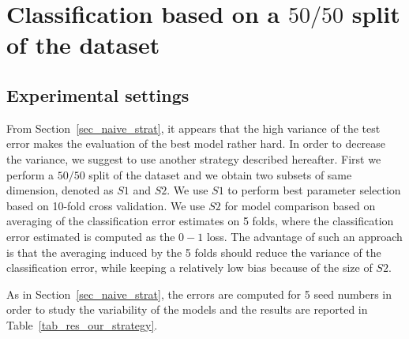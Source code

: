 \section{Classification based on a $50/50$ split of the dataset}
\label{sec_our_strat}
\subsection{Experimental settings}
From Section~\ref{sec_naive_strat}, it appears that the high variance of the test error makes the evaluation of the best model rather hard.
In order to decrease the variance, we suggest to use another strategy described hereafter. 
First we perform a $50/50$ split of the dataset and we obtain two subsets of same dimension, denoted as $S1$ and $S2$.
We use $S1$ to perform best parameter selection based on \num{10}-fold cross validation.
We use $S2$ for model comparison based on averaging of the classification error estimates on \num{5} folds, where the classification error estimated is computed as the $0-1$ loss. 
The advantage of such an approach is that the averaging induced by the \num{5} folds should reduce the variance of the classification error, while keeping a relatively low bias because of the size of $S2$. 

As in Section~\ref{sec_naive_strat}, the errors are computed for \num{5} seed numbers in order to study the variability of the models and the results are reported in Table~\ref{tab_res_our_strategy}.

